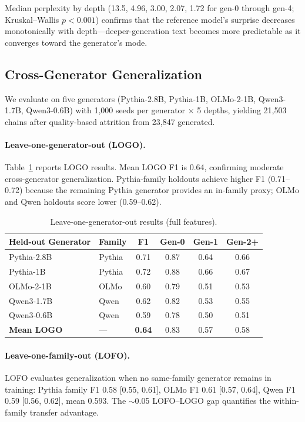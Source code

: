\documentclass[letterpaper]{article}
\begin{document}
Median perplexity by depth (13.5, 4.96, 3.00, 2.07, 1.72 for gen-0 through gen-4; Kruskal--Wallis $p{<}0.001$) confirms that the reference model's surprise decreases monotonically with depth---deeper-generation text becomes more predictable as it converges toward the generator's mode.

\subsection{Cross-Generator Generalization}
\label{sec:cross_gen}

We evaluate on five generators (Pythia-2.8B, Pythia-1B, OLMo-2-1B, Qwen3-1.7B, Qwen3-0.6B) with 1{,}000 seeds per generator $\times$ 5 depths, yielding 21{,}503 chains after quality-based attrition from 23{,}847 generated.

\paragraph{Leave-one-generator-out (LOGO).}
Table~\ref{tab:logo} reports LOGO results.
Mean LOGO F1 is 0.64, confirming moderate cross-generator generalization.
Pythia-family holdouts achieve higher F1 (0.71--0.72) because the remaining Pythia generator provides an in-family proxy; OLMo and Qwen holdouts score lower (0.59--0.62).

\begin{table}[h]
\centering
\caption{Leave-one-generator-out results (full features).}
\label{tab:logo}
\begin{tabular}{llcccc}
\toprule
Held-out Generator & Family & F1 & Gen-0 & Gen-1 & Gen-2+ \\
\midrule
Pythia-2.8B & Pythia & 0.71 & 0.87 & 0.64 & 0.66 \\
Pythia-1B & Pythia & 0.72 & 0.88 & 0.66 & 0.67 \\
OLMo-2-1B & OLMo & 0.60 & 0.79 & 0.51 & 0.53 \\
Qwen3-1.7B & Qwen & 0.62 & 0.82 & 0.53 & 0.55 \\
Qwen3-0.6B & Qwen & 0.59 & 0.78 & 0.50 & 0.51 \\
\midrule
\textbf{Mean LOGO} & --- & \textbf{0.64} & 0.83 & 0.57 & 0.58 \\
\bottomrule
\end{tabular}
\end{table}

\paragraph{Leave-one-family-out (LOFO).}
LOFO evaluates generalization when no same-family generator remains in training: Pythia family F1 0.58 [0.55, 0.61], OLMo F1 0.61 [0.57, 0.64], Qwen F1 0.59 [0.56, 0.62], mean 0.593.
The ${\sim}$0.05 LOFO--LOGO gap quantifies the within-family transfer advantage.
\end{document}
